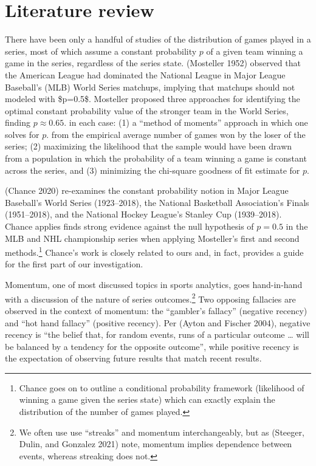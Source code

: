\documentclass[
]{article}
\begin{document}
\hypertarget{literature-review}{%
\section{Literature review}\label{literature-review}}

There have been only a handful of studies of the distribution of games
played in a series, most of which assume a constant probability \(p\) of
a given team winning a game in the series, regardless of the series
state. (Mosteller 1952) observed that the American League had dominated
the National League in Major League Baseball's (MLB) World Series
matchups, implying that matchups should not modeled with \$p=0.5\$.
Mosteller proposed three approaches for identifying the optimal constant
probability value of the stronger team in the World Series, finding
\(p \approx 0.65\). in each case: (1) a ``method of moments'' approach
in which one solves for \(p\). from the empirical average number of
games won by the loser of the series; (2) maximizing the likelihood that
the sample would have been drawn from a population in which the
probability of a team winning a game is constant across the series, and
(3) minimizing the chi-square goodness of fit estimate for \(p\).

(Chance 2020) re-examines the constant probability notion in Major
League Baseball's World Series (1923--2018), the National Basketball
Association's Finals (1951--2018), and the National Hockey League's
Stanley Cup (1939--2018). Chance applies finds strong evidence against
the null hypothesis of \(p = 0.5\) in the MLB and NHL championship
series when applying Mosteller's first and second methods.\footnote{Chance
  goes on to outline a conditional probability framework (likelihood of
  winning a game given the series state) which can exactly explain the
  distribution of the number of games played.} Chance's work is closely
related to ours and, in fact, provides a guide for the first part of our
investigation.

Momentum, one of most discussed topics in sports analytics, goes
hand-in-hand with a discussion of the nature of series
outcomes.\footnote{We often use use ``streaks'' and momentum
  interchangeably, but as (Steeger, Dulin, and Gonzalez 2021) note,
  momentum implies dependence between events, whereas streaking does
  not.} Two opposing fallacies are observed in the context of momentum:
the ``gambler's fallacy'' (negative recency) and ``hot hand fallacy''
(positive recency). Per (Ayton and Fischer 2004), negative recency is
``the belief that, for random events, runs of a particular outcome
\ldots{} will be balanced by a tendency for the opposite outcome'',
while positive recency is the expectation of observing future results
that match recent results.
\end{document}
